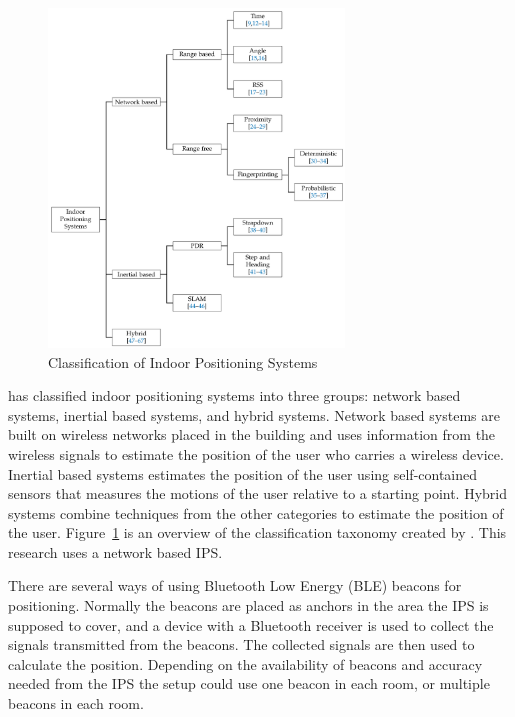 \documentclass[../Main/thesis.tex]{subfiles}
\begin{document}
\begin{figure}[h]
	\centering
	\includegraphics[width=0.7\textwidth]{../fig/ips}
	\caption[Classification of Indoor Positioning Systems]{Classification of Indoor Positioning Systems \citep[p. 2]{Correa2017}}
	\label{fig:ips}
\end{figure}

\citet{Correa2017} has classified indoor positioning systems into three groups: network based systems, inertial based systems, and hybrid systems.
Network based systems are built on wireless networks placed in the building and uses information from the wireless signals to estimate the position of the user who carries a wireless device.
Inertial based systems estimates the position of the user using self-contained sensors that measures the motions of the user relative to a starting point. 
Hybrid systems combine techniques from the other categories to estimate the position of the user.
Figure~\ref{fig:ips} is an overview of the classification taxonomy created by \citet{Correa2017}.
This research uses a network based IPS.

There are several ways of using Bluetooth Low Energy (BLE) beacons for positioning.
Normally the beacons are placed as anchors in the area the IPS is supposed to cover, and a device with a Bluetooth receiver is used to collect the signals transmitted from the beacons.
The collected signals are then used to calculate the position.
Depending on the availability of beacons and accuracy needed from the IPS the setup could use one beacon in each room, or multiple beacons in each room.
\end{document}
